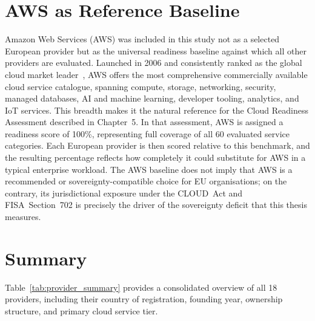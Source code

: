 \section{AWS as Reference Baseline}
\label{sec:aws_baseline}

Amazon Web Services (AWS) was included in this study not as a selected European provider but as the universal readiness baseline against which all other providers are evaluated. Launched in 2006 and consistently ranked as the global cloud market leader~\cite{Flexera_CloudReport_2024}, AWS offers the most comprehensive commercially available cloud service catalogue, spanning compute, storage, networking, security, managed databases, AI and machine learning, developer tooling, analytics, and IoT services. This breadth makes it the natural reference for the Cloud Readiness Assessment described in Chapter~5. In that assessment, AWS is assigned a readiness score of 100\%, representing full coverage of all 60 evaluated service categories. Each European provider is then scored relative to this benchmark, and the resulting percentage reflects how completely it could substitute for AWS in a typical enterprise workload. The AWS baseline does not imply that AWS is a recommended or sovereignty-compatible choice for EU organisations; on the contrary, its jurisdictional exposure under the CLOUD~Act and FISA~Section~702 is precisely the driver of the sovereignty deficit that this thesis measures.

\section{Summary}
\label{sec:provider_summary}

Table~\ref{tab:provider_summary} provides a consolidated overview of all 18 providers, including their country of registration, founding year, ownership structure, and primary cloud service tier.

